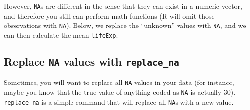 \documentclass[
]{book}
\newenvironment{Shaded}{\begin{snugshade}}{\end{snugshade}}
\newcommand{\CommentTok}[1]{\textcolor[rgb]{0.56,0.35,0.01}{\textit{#1}}}
\newcommand{\DataTypeTok}[1]{\textcolor[rgb]{0.13,0.29,0.53}{#1}}
\newcommand{\DecValTok}[1]{\textcolor[rgb]{0.00,0.00,0.81}{#1}}
\newcommand{\KeywordTok}[1]{\textcolor[rgb]{0.13,0.29,0.53}{\textbf{#1}}}
\newcommand{\NormalTok}[1]{#1}
\newcommand{\OperatorTok}[1]{\textcolor[rgb]{0.81,0.36,0.00}{\textbf{#1}}}
\newcommand{\OtherTok}[1]{\textcolor[rgb]{0.56,0.35,0.01}{#1}}
\newcommand{\StringTok}[1]{\textcolor[rgb]{0.31,0.60,0.02}{#1}}
\begin{document}
However, \texttt{NA}s are different in the sense that they can exist in a numeric vector, and therefore you still can perform math functions (R will omit those observations with \texttt{NA}). Below, we replace the ``unknown'' values with \texttt{NA}, and we can then calculate the mean \texttt{lifeExp}.

\begin{Shaded}
\end{Shaded}

\hypertarget{replace-na-values-with-replace_na}{%
\subsection{\texorpdfstring{Replace \texttt{NA} values with \texttt{replace\_na}}{Replace NA values with replace\_na}}\label{replace-na-values-with-replace_na}}

Sometimes, you will want to replace all \texttt{NA} values in your data (for instance, maybe you know that the true value of anything coded as \texttt{NA} is actually 30). \texttt{replace\_na} is a simple command that will replace all \texttt{NA}s with a new value.

\begin{Shaded}
\end{Shaded}
\end{document}
